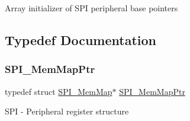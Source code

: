 Array initializer of S\+PI peripheral base pointers 

\subsection{Typedef Documentation}
\mbox{\label{group___s_p_i___peripheral_ga7e4e9921e4d56bdbb10a04e77743ff5e}} 
\subsubsection{\texorpdfstring{S\+P\+I\+\_\+\+Mem\+Map\+Ptr}{SPI\_MemMapPtr}}
{\footnotesize\ttfamily typedef struct \hyperlink{struct_s_p_i___mem_map}{S\+P\+I\+\_\+\+Mem\+Map}$\ast$ \hyperlink{group___s_p_i___peripheral_ga7e4e9921e4d56bdbb10a04e77743ff5e}{S\+P\+I\+\_\+\+Mem\+Map\+Ptr}}

S\+PI -\/ Peripheral register structure 